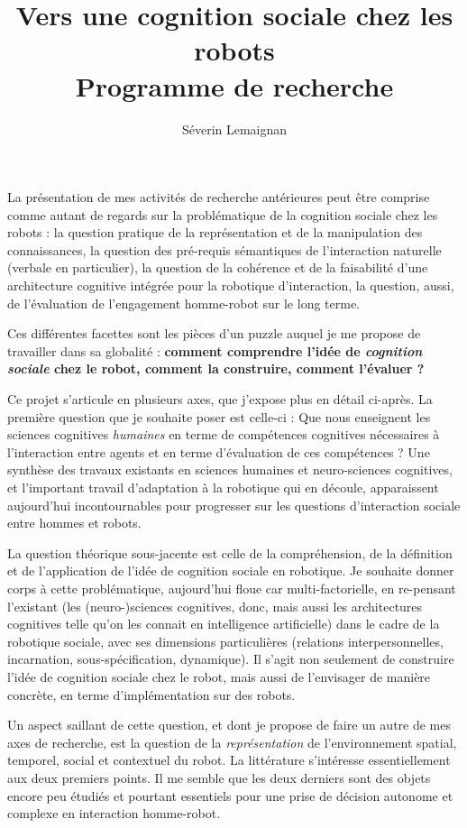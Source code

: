 \documentclass[a4paper]{article}
\title{Vers une cognition sociale chez les robots \\ 
    {\large Programme de recherche}}
\author{Séverin Lemaignan}
\date{}
\begin{document}
\maketitle

La présentation de mes activités de recherche antérieures peut être comprise comme
autant de regards sur la problématique de la cognition sociale chez les robots : la
question pratique de la représentation et de la manipulation des connaissances,
la question des pré-requis sémantiques de l'interaction naturelle (verbale en
particulier), la question de la cohérence et de la faisabilité d'une
architecture cognitive intégrée pour la robotique d'interaction, la question,
aussi, de l'évaluation de l'engagement homme-robot sur le long terme.

Ces différentes facettes sont les pièces d'un puzzle auquel je me propose de
travailler dans sa globalité : \textbf{comment comprendre l'idée de \emph{cognition
sociale} chez le robot, comment la construire, comment l'évaluer ?}

Ce projet s'articule en plusieurs axes, que j'expose plus en détail ci-après.
La première question que je souhaite poser est celle-ci : Que nous enseignent
les sciences cognitives \emph{humaines} en terme de compétences cognitives
nécessaires à l'interaction entre agents et en terme d'évaluation de ces
compétences ? Une synthèse des travaux existants en sciences humaines et
neuro-sciences cognitives, et l'important travail d'adaptation à la robotique
qui en découle, apparaissent aujourd'hui incontournables pour progresser sur les
questions d'interaction sociale entre hommes et robots.

La question théorique sous-jacente est celle de la compréhension, de la
définition et de l'application de l'idée de cognition sociale en robotique. Je
souhaite donner corps à cette problématique, aujourd'hui floue car
multi-factorielle, en re-pensant l'existant (les (neuro-)sciences cognitives, donc,
mais aussi les architectures cognitives telle qu'on les connait en intelligence
artificielle) dans le cadre de la robotique sociale, avec ses dimensions
particulières (relations interpersonnelles, incarnation, sous-spécification,
dynamique). Il s'agit non seulement de construire l'idée de cognition sociale
chez le robot, mais aussi de l'envisager de manière concrète, en terme
d'implémentation sur des robots.

Un aspect saillant de cette question, et dont je propose de faire un autre de
mes axes de recherche, est la question de la \emph{représentation} de
l'environnement spatial, temporel, social et contextuel du robot. La littérature
s'intéresse essentiellement aux deux premiers points. Il me semble que les deux
derniers sont des objets encore peu étudiés et pourtant essentiels pour une
prise de décision autonome et complexe en interaction homme-robot.
\end{document}
